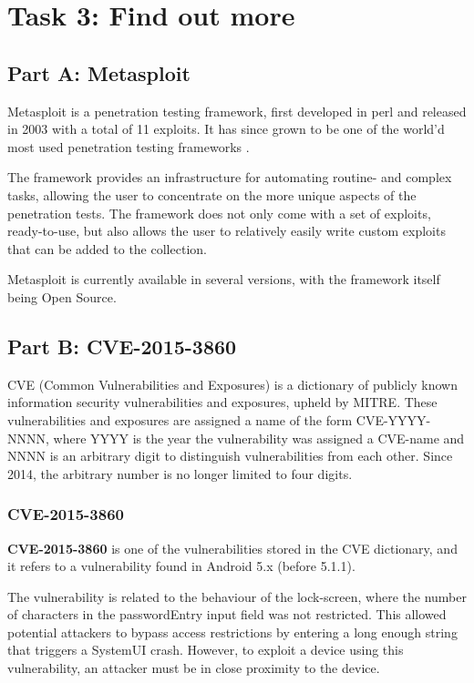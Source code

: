 \pagebreak
\section{Task 3: Find out more}

\subsection{Part A: Metasploit}
Metasploit is a penetration testing framework, first developed in perl and
released in 2003 with a total of 11 exploits\cite{NOSTARCHMETASPLOIT}. It has
since grown to be one of the world'd most used penetration testing frameworks
\cite{METASPLHOME}.

The framework provides an infrastructure for automating routine- and complex
tasks, allowing the user to concentrate on the more unique aspects of the
penetration tests. The framework does not only come with a set of exploits,
ready-to-use, but also allows the user to relatively easily write custom
exploits that can be added to the collection.

Metasploit is currently available in several versions, with the framework
itself being Open Source.\cite{METASPLEDIT}

\subsection{Part B: CVE-2015-3860}
CVE (Common Vulnerabilities and Exposures) is a dictionary of publicly
known information security vulnerabilities and exposures, upheld by
MITRE\cite{CVE}. These vulnerabilities and exposures are assigned a
name of the form CVE-YYYY-NNNN, where YYYY is the year the vulnerability
was assigned a CVE-name and NNNN is an arbitrary digit to distinguish
vulnerabilities from each other. Since 2014, the arbitrary number is no
longer limited to four digits.\cite{CVESYNTAX}

\subsubsection{CVE-2015-3860}
\textbf{CVE-2015-3860} is one of the vulnerabilities stored in the CVE
dictionary, and it refers to a vulnerability found in Android 5.x
(before 5.1.1).

The vulnerability is related to the behaviour of the lock-screen, where
the number of characters in the passwordEntry input field was not restricted.
This allowed potential attackers to bypass access restrictions by entering a
long enough string that triggers a SystemUI crash. However, to exploit a device
using this vulnerability, an attacker must be in close proximity to the device\cite{CVE-2015-3860}.
